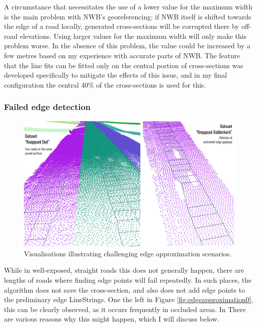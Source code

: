 A circumstance that necessitates the use of a lower value for the maximum width is the main problem with NWB's georeferencing: if NWB itself is shifted towards the edge of a road locally, generated cross-sections will be corrupted there by off-road elevations. Using larger values for the maximum width will only make this problem worse. In the absence of this problem, the value could be increased by a few metres based on my experience with accurate parts of NWB. The feature that the line fits can be fitted only on the central portion of cross-sections was developed specifically to mitigate the effects of this issue, and in my final configuration the central 40\% of the cross-sections is used for this.

\subsubsection{Failed edge detection}

\begin{figure}[]
    \centering
    \includegraphics[width=0.9\linewidth]{final_report/figs/edgeapproximation1.png}
    \caption{Visualisations illustrating challenging edge approximation scenarios.}
    \label{fig:edgeapproximation1}
\end{figure}

While in well-exposed, straight roads this does not generally happen, there are lengths of roads where finding edge points will fail repeatedly. In such places, the algorithm does not save the cross-section, and also does not add edge points to the preliminary edge LineStrings. One the left in Figure \ref{fig:edgeapproximation0}, this can be clearly observed, as it occurs frequently in occluded areas. In There are various reasons why this might happen, which I will discuss below.

